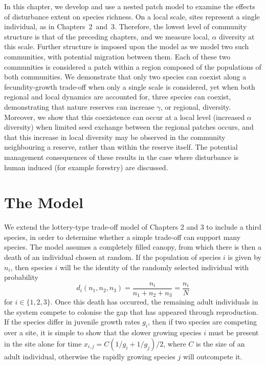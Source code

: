 In this chapter, we develop and use a nested patch model to examine the effects of disturbance extent on species richness. On a local scale, sites represent a single individual, as in Chapters~2~and~3. Therefore, the lowest level of community structure is that of the preceding chapters, and we measure local, $\alpha$ diversity at this scale. Further structure is imposed upon the model as we model two such communities, with potential migration between them. Each of these two communities is considered a patch within a region composed of the populations of both communities. We demonstrate that only two species can coexist along a fecundity-growth trade-off when only a single scale is considered, yet when both regional and local dynamics are accounted for, three species can coexist, demonstrating that nature reserves can increase $\gamma$, or regional, diversity. Moreover, we show that this coexistence can occur at a local level (increased $\alpha$ diversity) when limited seed exchange between the regional patches occurs, and that this increase in local diversity may be observed in the community neighbouring a reserve, rather than within the reserve itself. The potential management consequences of these results in the case where disturbance is human induced (for example forestry) are discussed.



\section{The Model}
We extend the lottery-type trade-off model of Chapters 2 and 3 to include a third species, in order to determine whether a simple trade-off can support many species. The model assumes a completely filled canopy, from which there is then a death of an individual chosen at random. If the population of species $i$ is given by $n_i$, then species $i$ will be the identity of the randomly selected individual with probability
\begin{equation}
\label{d}
d_i(n_1,n_2,n_3)=\frac{n_i}{n_1+n_2+n_3}=\frac{n_i}{N} \end{equation}
for $i \in \{1,2,3\}$. Once this death has occurred, the remaining adult individuals in the system compete to colonise the gap that has appeared through reproduction. If the species differ in juvenile growth rates $g_i$, then if two species are competing over a site, it is simple to show that the slower growing species $i$ must be present in the site alone for time $x_{i,j}=C(1/g_i +1/g_j)/2$, where $C$ is the size of an adult individual, otherwise the rapidly growing species $j$ will outcompete it.


